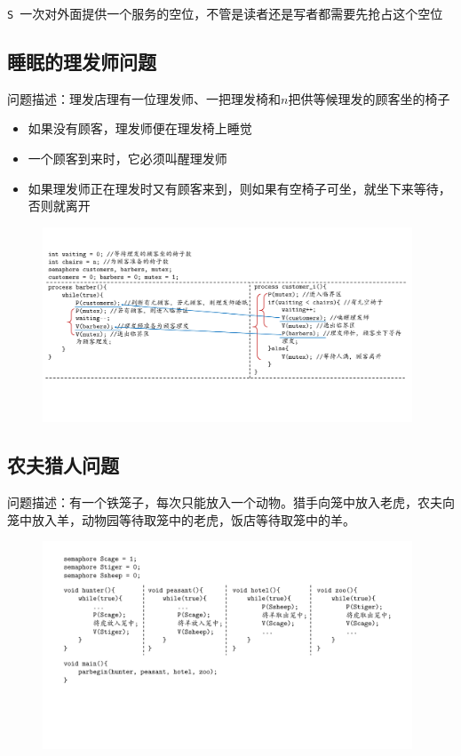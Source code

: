 \documentclass[cs4size,a4paper,10pt]{ctexart}
\begin{document}
	\verb|S|\ 一次对外面提供一个服务的空位，不管是读者还是写者都需要先抢占这个空位

	\subsection{睡眠的理发师问题}
	问题描述：理发店理有一位理发师、一把理发椅和$n$把供等候理发的顾客坐的椅子
	\begin{itemize}
		\item 如果没有顾客，理发师便在理发椅上睡觉
		\item 一个顾客到来时，它必须叫醒理发师
		\item 如果理发师正在理发时又有顾客来到，则如果有空椅子可坐，就坐下来等待，否则就离开
	\end{itemize}

	\begin{figure}[H]
		\centering
		\includegraphics[width=0.98\textwidth]{img/理发师问题.pdf}
	\end{figure}

	\subsection{农夫猎人问题}
	问题描述：有一个铁笼子，每次只能放入一个动物。猎手向笼中放入老虎，农夫向笼中放入羊，动物园等待取笼中的老虎，饭店等待取笼中的羊。

	\begin{figure}[H]
		\centering
		\includegraphics[width=0.98\textwidth]{img/农夫猎人问题.pdf}
	\end{figure}
\end{document}
